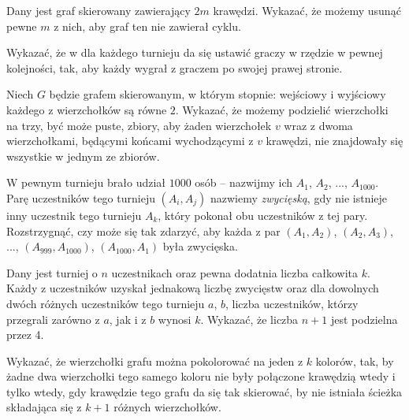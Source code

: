 \begin{problem}{1}
	Dany jest graf skierowany zawierający $2m$ krawędzi. Wykazać, że możemy usunąć pewne $m$ z nich, aby graf ten nie zawierał cyklu.
\end{problem}

\begin{problem}{2}
	Wykazać, że w dla każdego turnieju da się ustawić graczy w rzędzie w pewnej kolejności, tak, aby każdy wygrał z graczem po swojej prawej stronie.
\end{problem}

\begin{problem}{3}
	Niech $G$ będzie grafem skierowanym, w którym stopnie: wejściowy i wyjściowy każdego z wierzchołków są równe $2$. Wykazać, że możemy podzielić wierzchołki na trzy, być może puste, zbiory, aby żaden wierzchołek $v$ wraz z dwoma wierzchołkami, będącymi końcami wychodzącymi z $v$ krawędzi, nie znajdowały się wszystkie w jednym ze zbiorów.
\end{problem}

\begin{problem}{4}
	W pewnym turnieju brało udział $1000$ osób -- nazwijmy ich $A_1$, $A_2$, ..., $A_{1000}$. Parę uczestników tego turnieju $(A_i, A_j)$ nazwiemy \textit{zwycięską}, gdy nie istnieje inny uczestnik tego turnieju $A_k$, który pokonał obu uczestników z tej pary. Rozstrzygnąć, czy może się tak zdarzyć, aby każda z par $(A_1, A_2)$, $(A_2, A_3)$, ..., $(A_{999}, A_{1000})$, $(A_{1000}, A_{1})$ była zwycięska.
\end{problem}

\begin{problem}{5}
	Dany jest turniej o $n$ uczestnikach oraz pewna dodatnia liczba całkowita $k$. Każdy z uczestników uzyskał jednakową liczbę zwycięstw oraz dla dowolnych dwóch różnych uczestników tego turnieju $a$, $b$, liczba uczestników, którzy przegrali zarówno z $a$, jak i z $b$ wynosi $k$. Wykazać, że liczba $n + 1$ jest podzielna przez 4.
\end{problem}

\begin{problem}{6}
	Wykazać, że wierzchołki grafu można pokolorować na jeden z $k$ kolorów, tak, by żadne dwa wierzchołki tego samego koloru nie były połączone krawędzią wtedy i tylko wtedy, gdy krawędzie tego grafu da się tak skierować, by nie istniała ścieżka składająca się z $k + 1$ różnych wierzchołków.
\end{problem}